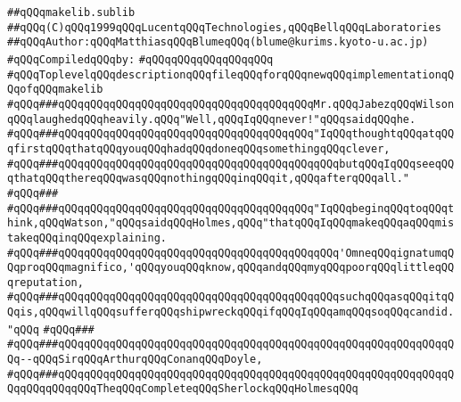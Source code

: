 \label{src/app/makelib/makelib.sublib}
\verb|##qQQqmakelib.sublib|\newline
\verb|##qQQq(C)qQQq1999qQQqLucentqQQqTechnologies,qQQqBellqQQqLaboratories|\newline
\verb|##qQQqAuthor:qQQqMatthiasqQQqBlumeqQQq(blume@kurims.kyoto-u.ac.jp)|\newline
\newline
\verb|#qQQqCompiledqQQqby:|\newline
\verb|#qQQqqQQqqQQqqQQqqQQq|\newline
\newline
\newline
\verb|#qQQqToplevelqQQqdescriptionqQQqfileqQQqforqQQqnewqQQqimplementationqQQqofqQQqmakelib|\newline
\newline
\newline
\verb|#qQQq###qQQqqQQqqQQqqQQqqQQqqQQqqQQqqQQqqQQqqQQqMr.qQQqJabezqQQqWilsonqQQqlaughedqQQqheavily.qQQq"Well,qQQqIqQQqnever!"qQQqsaidqQQqhe.|\newline
\verb|#qQQq###qQQqqQQqqQQqqQQqqQQqqQQqqQQqqQQqqQQqqQQq"IqQQqthoughtqQQqatqQQqfirstqQQqthatqQQqyouqQQqhadqQQqdoneqQQqsomethingqQQqclever,|\newline
\verb|#qQQq###qQQqqQQqqQQqqQQqqQQqqQQqqQQqqQQqqQQqqQQqqQQqbutqQQqIqQQqseeqQQqthatqQQqthereqQQqwasqQQqnothingqQQqinqQQqit,qQQqafterqQQqall."|\newline
\verb|#qQQq###|\newline
\verb|#qQQq###qQQqqQQqqQQqqQQqqQQqqQQqqQQqqQQqqQQqqQQq"IqQQqbeginqQQqtoqQQqthink,qQQqWatson,"qQQqsaidqQQqHolmes,qQQq"thatqQQqIqQQqmakeqQQqaqQQqmistakeqQQqinqQQqexplaining.|\newline
\verb|#qQQq###qQQqqQQqqQQqqQQqqQQqqQQqqQQqqQQqqQQqqQQqqQQq'OmneqQQqignatumqQQqproqQQqmagnifico,'qQQqyouqQQqknow,qQQqandqQQqmyqQQqpoorqQQqlittleqQQqreputation,|\newline
\verb|#qQQq###qQQqqQQqqQQqqQQqqQQqqQQqqQQqqQQqqQQqqQQqqQQqsuchqQQqasqQQqitqQQqis,qQQqwillqQQqsufferqQQqshipwreckqQQqifqQQqIqQQqamqQQqsoqQQqcandid."qQQq|\newline
\verb|#qQQq###|\newline
\verb|#qQQq###qQQqqQQqqQQqqQQqqQQqqQQqqQQqqQQqqQQqqQQqqQQqqQQqqQQqqQQqqQQqqQQq--qQQqSirqQQqArthurqQQqConanqQQqDoyle,|\newline
\verb|#qQQq###qQQqqQQqqQQqqQQqqQQqqQQqqQQqqQQqqQQqqQQqqQQqqQQqqQQqqQQqqQQqqQQqqQQqqQQqqQQqTheqQQqCompleteqQQqSherlockqQQqHolmesqQQq|\newline

